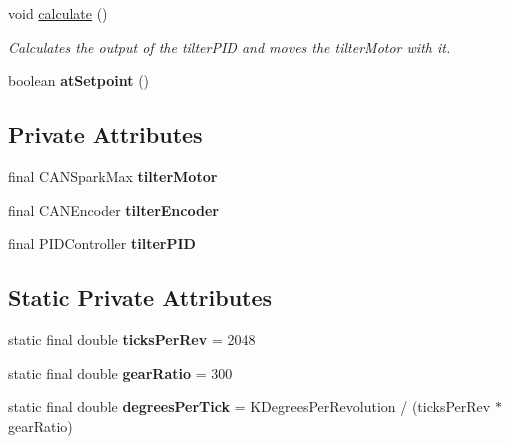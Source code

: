 \begin{DoxyCompactItemize}
void \mbox{\hyperlink{classfrc_1_1robot_1_1subsystems_1_1_tilter_aaeae2a3c8c66df3699be87fbb0ede775}{calculate}} ()
\begin{DoxyCompactList}\small\item\em Calculates the output of the tilter\+P\+ID and moves the tilter\+Motor with it. \end{DoxyCompactList}\item 
\mbox{\label{classfrc_1_1robot_1_1subsystems_1_1_tilter_a4eb4a632f4454239ff0768615f3614f9}} 
boolean {\bfseries at\+Setpoint} ()
\end{DoxyCompactItemize}
\subsection*{Private Attributes}
\begin{DoxyCompactItemize}
\item 
\mbox{\label{classfrc_1_1robot_1_1subsystems_1_1_tilter_a115a5162cbcbb8033dbb9f20c682ee5b}} 
final C\+A\+N\+Spark\+Max {\bfseries tilter\+Motor}
\item 
\mbox{\label{classfrc_1_1robot_1_1subsystems_1_1_tilter_a29558db27300dfeb5aad050e64f575f2}} 
final C\+A\+N\+Encoder {\bfseries tilter\+Encoder}
\item 
\mbox{\label{classfrc_1_1robot_1_1subsystems_1_1_tilter_a282a11b40e38b06adc8124af28323669}} 
final P\+I\+D\+Controller {\bfseries tilter\+P\+ID}
\end{DoxyCompactItemize}
\subsection*{Static Private Attributes}
\begin{DoxyCompactItemize}
\item 
\mbox{\label{classfrc_1_1robot_1_1subsystems_1_1_tilter_a2d5ebed49281172b69509c43ff64042d}} 
static final double {\bfseries ticks\+Per\+Rev} = 2048
\item 
\mbox{\label{classfrc_1_1robot_1_1subsystems_1_1_tilter_a0ff9b9c5b0902c0ec4476699dfedac9e}} 
static final double {\bfseries gear\+Ratio} = 300
\item 
\mbox{\label{classfrc_1_1robot_1_1subsystems_1_1_tilter_a1b7589b1a6a1cafd0026fac7d16e586b}} 
static final double {\bfseries degrees\+Per\+Tick} = K\+Degrees\+Per\+Revolution / (ticks\+Per\+Rev $\ast$ gear\+Ratio)
\end{DoxyCompactItemize}


